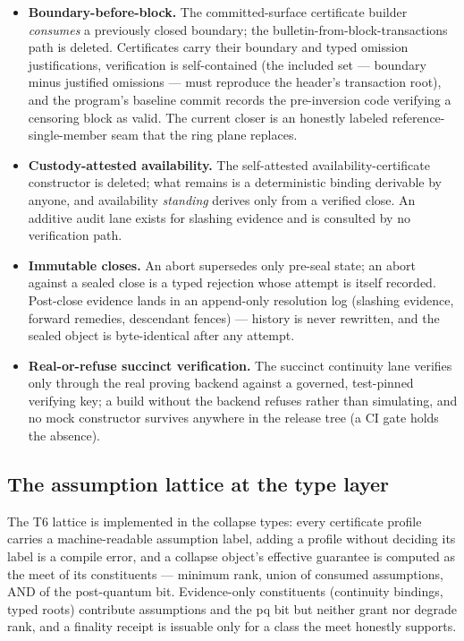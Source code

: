 \documentclass[11pt]{article}
\begin{document}
\begin{itemize}[leftmargin=1.5em]
\item \textbf{Boundary-before-block.} The committed-surface certificate
builder \emph{consumes} a previously closed boundary; the
bulletin-from-block-transactions path is deleted. Certificates carry
their boundary and typed omission justifications, verification is
self-contained (the included set --- boundary minus justified omissions
--- must reproduce the header's transaction root), and the program's
baseline commit records the pre-inversion code verifying a censoring
block as valid. The current closer is an honestly labeled
reference-single-member seam that the ring plane replaces.
\item \textbf{Custody-attested availability.} The self-attested
availability-certificate constructor is deleted; what remains is a
deterministic binding derivable by anyone, and availability
\emph{standing} derives only from a verified close. An additive audit
lane exists for slashing evidence and is consulted by no verification
path.
\item \textbf{Immutable closes.} An abort supersedes only pre-seal state;
an abort against a sealed close is a typed rejection whose attempt is
itself recorded. Post-close evidence lands in an append-only resolution
log (slashing evidence, forward remedies, descendant fences) --- history
is never rewritten, and the sealed object is byte-identical after any
attempt.
\item \textbf{Real-or-refuse succinct verification.} The succinct
continuity lane verifies only through the real proving backend against a
governed, test-pinned verifying key; a build without the backend refuses
rather than simulating, and no mock constructor survives anywhere in the
release tree (a CI gate holds the absence).
\end{itemize}

\subsection{The assumption lattice at the type layer}

The T6 lattice is implemented in the collapse types: every certificate
profile carries a machine-readable assumption label, adding a profile
without deciding its label is a compile error, and a collapse object's
effective guarantee is computed as the meet of its constituents ---
minimum rank, union of consumed assumptions, AND of the post-quantum bit.
Evidence-only constituents (continuity bindings, typed roots) contribute
assumptions and the pq bit but neither grant nor degrade rank, and a
finality receipt is issuable only for a class the meet honestly supports.
\end{document}
